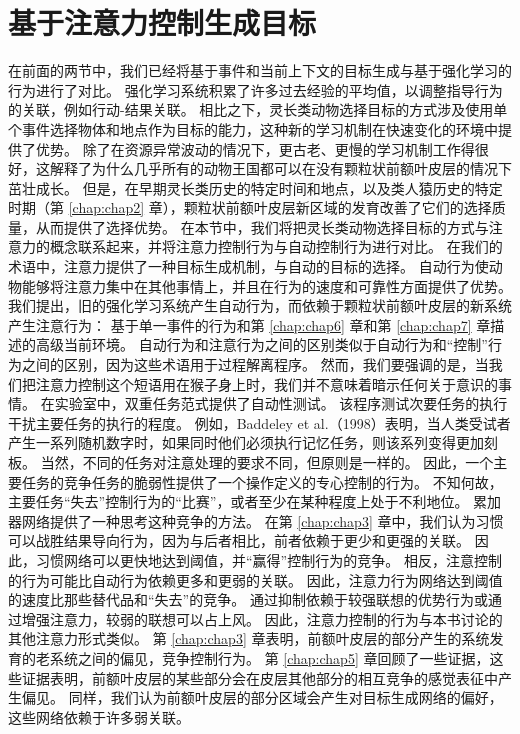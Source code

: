 \section{基于注意力控制生成目标}

在前面的两节中，我们已经将基于事件和当前上下文的目标生成与基于强化学习的行为进行了对比。
强化学习系统积累了许多过去经验的平均值，以调整指导行为的关联，例如行动-结果关联。
相比之下，灵长类动物选择目标的方式涉及使用单个事件选择物体和地点作为目标的能力，这种新的学习机制在快速变化的环境中提供了优势。
除了在资源异常波动的情况下，更古老、更慢的学习机制工作得很好，这解释了为什么几乎所有的动物王国都可以在没有颗粒状前额叶皮层的情况下茁壮成长。
但是，在早期灵长类历史的特定时间和地点，以及类人猿历史的特定时期（第 \ref{chap:chap2} 章），颗粒状前额叶皮层新区域的发育改善了它们的选择质量，从而提供了选择优势。
在本节中，我们将把灵长类动物选择目标的方式与注意力的概念联系起来，并将注意力控制行为与自动控制行为进行对比。
在我们的术语中，注意力提供了一种目标生成机制，与自动的目标的选择。
自动行为使动物能够将注意力集中在其他事情上，并且在行为的速度和可靠性方面提供了优势。
我们提出，旧的强化学习系统产生自动行为，而依赖于颗粒状前额叶皮层的新系统产生注意行为：
基于单一事件的行为和第 \ref{chap:chap6} 章和第 \ref{chap:chap7} 章描述的高级当前环境。
自动行为和注意行为之间的区别类似于自动行为和“控制”行为之间的区别，因为这些术语用于过程解离程序。
然而，我们要强调的是，当我们把注意力控制这个短语用在猴子身上时，我们并不意味着暗示任何关于意识的事情。
在实验室中，双重任务范式提供了自动性测试。
该程序测试次要任务的执行干扰主要任务的执行的程度。
例如，Baddeley et al.（1998）表明，当人类受试者产生一系列随机数字时，如果同时他们必须执行记忆任务，则该系列变得更加刻板。
当然，不同的任务对注意处理的要求不同，但原则是一样的。
因此，一个主要任务的竞争任务的脆弱性提供了一个操作定义的专心控制的行为。
不知何故，主要任务“失去”控制行为的“比赛”，或者至少在某种程度上处于不利地位。
累加器网络提供了一种思考这种竞争的方法。
在第 \ref{chap:chap3} 章中，我们认为习惯可以战胜结果导向行为，因为与后者相比，前者依赖于更少和更强的关联。
因此，习惯网络可以更快地达到阈值，并“赢得”控制行为的竞争。
相反，注意控制的行为可能比自动行为依赖更多和更弱的关联。
因此，注意力行为网络达到阈值的速度比那些替代品和“失去”的竞争。
通过抑制依赖于较强联想的优势行为或通过增强注意力，较弱的联想可以占上风。
因此，注意力控制的行为与本书讨论的其他注意力形式类似。
第 \ref{chap:chap3} 章表明，前额叶皮层的部分产生的系统发育的老系统之间的偏见，竞争控制行为。
第 \ref{chap:chap5} 章回顾了一些证据，这些证据表明，前额叶皮层的某些部分会在皮层其他部分的相互竞争的感觉表征中产生偏见。
同样，我们认为前额叶皮层的部分区域会产生对目标生成网络的偏好，这些网络依赖于许多弱关联。
